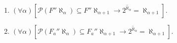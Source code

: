 \begin{enumerate}
\item $(\forall \alpha)[\mathcal{P}(F''\aleph_\alpha) \subseteq F''\aleph_{\alpha+1} \rightarrow \overline{2^{\aleph_\alpha}} = \aleph_{\alpha+1}]$.
\item $(\forall \alpha)[\mathcal{P}(F_a''\aleph_\alpha) \subseteq F_a''\aleph_{\alpha+1} \rightarrow \overline{2^{\aleph_\alpha}} = \aleph_{\alpha+1}]$.
\end{enumerate}
